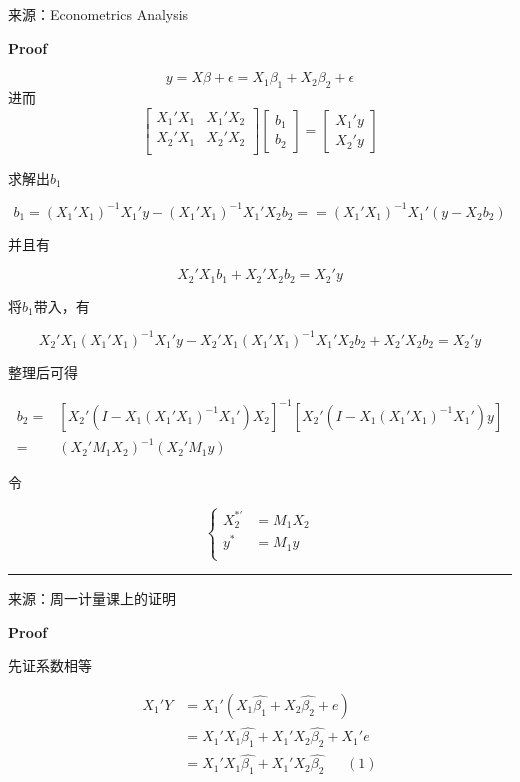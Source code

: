 \documentclass{article}
\begin{document}
\begin{enumerate}
    来源：Econometrics Analysis

    \textbf{Proof}

    $$
    y=X\beta+\epsilon=X_1\beta_1+X_2\beta_2+\epsilon
    $$
    进而
    $$
    \left[
    \begin{array}{cc}
      X_1'X_1 & X_1'X_2 \\
      X_2'X_1 & X_2'X_2 \\
    \end{array}
    \right]
    \left[
    \begin{array}{c}
      b_1 \\
      b_2
    \end{array}
    \right]
    =
    \left[
    \begin{array}{c}
      X_1'y \\
      X_2'y
    \end{array}
    \right]
    $$

    求解出$b_1$

    $$
    b_1=(X_1'X_1)^{-1}X_1'y-(X_1'X_1)^{-1}X_1'X_2b_2==(X_1'X_1)^{-1}X_1'(y-X_2b_2)
    $$

    并且有

    $$
    X_2'X_1b_1+X_2'X_2b_2=X_2'y
    $$

    将$b_1$带入，有

    $$
    X_2'X_1(X_1'X_1)^{-1}X_1'y-X_2'X_1(X_1'X_1)^{-1}X_1'X_2b_2+X_2'X_2b_2=X_2'y
    $$

    整理后可得

    $$
    \begin{aligned}
    b_2 =& [X_2'(I-X_1(X_1'X_1)^{-1}X_1')X_2]^{-1}[X_2'(I-X_1(X_1'X_1)^{-1}X_1')y] \\
    =& (X_2'M_1X_2)^{-1}(X_2'M_1y)
    \end{aligned}
    $$

    令

    $$
    \left\{
    \begin{aligned}
    X_2^{*'} &= M_1X_2 \\
    y^* &= M_1y \\
    \end{aligned}
    \right.
    $$
    
    \noindent\rule{\textwidth}{0.4pt}

        来源：周一计量课上的证明

        \textbf{Proof}

        先证系数相等

        $$
          \begin{aligned}
            X_1'Y & = X_1'(X_1\widehat{\beta_1}+X_2\widehat{\beta_2}+e) \\
            & = X_1'X_1\widehat{\beta_1}+X_1'X_2\widehat{\beta_2}+X_1'e \\
            & = X_1'X_1\widehat{\beta_1}+X_1'X_2\widehat{\beta_2} \ \ \ \ \ \ \ (1)
          \end{aligned}
        $$


\end{enumerate}
\end{document}
